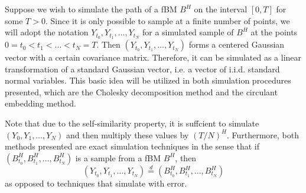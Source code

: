 Suppose we wish to simulate the path of a fBM $B^{H}$ on the interval $[0,T]$ for some $T>0$. Since it is only possible to sample at a finite number of points, we will adopt the notation $Y_{t_{0}},Y_{t_{1}},\dots,Y_{t_{N}}$ for a simulated sample of $B^H$ at the points $0=t_{0}<t_{1}<\dots<t_{N}=T$. Then $(Y_{t_{0}},Y_{t_{1}},\dots,Y_{t_{N}})$ forms a centered Gaussian vector with a certain covariance matrix. Therefore, it can be simulated as a linear transformation of a standard Gaussian vector, i.e. a vector of i.i.d. standard normal variables. This basic idea will be utilized in both simulation procedures presented, which are the Cholesky decomposition method and the circulant embedding method. 

Note that due to the self-similarity property, it is suffcient to simulate $(Y_{0},Y_{1},\dots, Y_{N})$ and then multiply these values by $(T/N)^H$. Furthermore, both methods presented are exact simulation techniques in the sense that if $(B_{t_{0}}^{H},B_{t_{1}}^{H},\dots, B_{t_{N}}^{H})$ is a sample from a fBM $B^H$, then 
\begin{equation}
    (Y_{t_{0}},Y_{t_{1}},\dots,Y_{t_{N}}) \overset{d}{=}(B_{t_{0}}^{H},B_{t_{1}}^{H},\dots, B_{t_{N}}^{H})
\end{equation}
as opposed to techniques that simulate with error.

